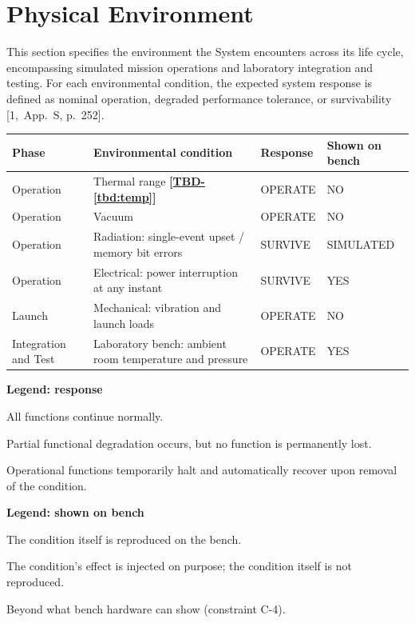 \documentclass[11pt,a4paper]{article}
\newcommand{\tbd}[1]{\mbox{\textbf{[\hyperref[tbd:#1]{TBD-\ref*{tbd:#1}}]}}}
\begin{document}
\section{Physical Environment}
This section specifies the environment the System encounters across its life
cycle, encompassing simulated mission operations and laboratory integration
and testing. For each environmental condition, the expected system response is
defined as nominal operation, degraded performance tolerance, or survivability
[1,~App.~S, p.~252].

\begin{table}[H]
\centering
\begin{tabularx}{\textwidth}{@{}l>{\raggedright\arraybackslash}Xll@{}}
\toprule
Phase & Environmental condition & Response & Shown on bench \\
\midrule
Operation & Thermal range \tbd{temp} & OPERATE & NO \\
Operation & Vacuum & OPERATE & NO \\
Operation & Radiation: single-event upset / memory bit errors & SURVIVE & SIMULATED \\
Operation & Electrical: power interruption at any instant & SURVIVE & YES \\
Launch & Mechanical: vibration and launch loads & OPERATE & NO \\
Integration and Test & Laboratory bench: ambient room temperature and pressure & OPERATE & YES \\
\bottomrule
\end{tabularx}
\end{table}

\noindent\textbf{Legend: response}
\begin{description}[leftmargin=3.2cm]
\item[OPERATE] All functions continue normally.
\item[TOLERATE] Partial functional degradation occurs, but no function is
  permanently lost.
\item[SURVIVE] Operational functions temporarily halt and automatically recover
  upon removal of the condition.
\end{description}

\medskip
\noindent\textbf{Legend: shown on bench}
\begin{description}[leftmargin=3.2cm]
\item[YES] The condition itself is reproduced on the bench.
\item[SIMULATED] The condition's effect is injected on purpose; the condition
  itself is not reproduced.
\item[NO] Beyond what bench hardware can show (constraint C-4).
\end{description}
\end{document}
